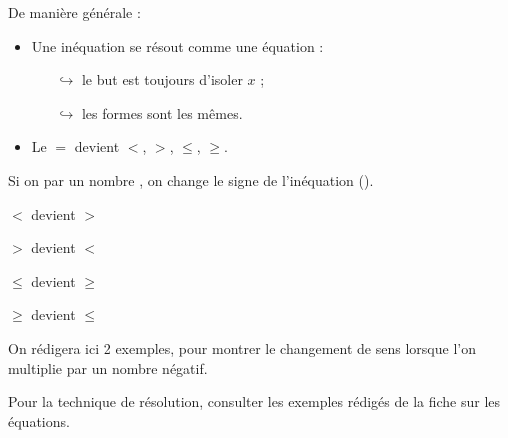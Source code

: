 \ifdefined\COMPLETE
\else
    
    
\fi

                 
                 
\bigskip     

De manière générale :

\begin{itemize}
\item Une inéquation se résout comme une équation : 
     \begin{itemize}
     \item [$\hookrightarrow$] le but est toujours d'isoler $x$ ; 
     \item [$\hookrightarrow$] les formes sont les mêmes.
     \end{itemize}
\item Le $=$ devient $<$, $>$, $\leqslant$, $\geqslant$.     
\end{itemize}    

\bigskip 



\medskip 

Si on  par un nombre , on change le signe de l'inéquation ().
   

\medskip 

\begin{description}
\item $<$ devient $>$
\item $>$ devient $<$
\item $\leqslant$ devient $\geqslant$
\item $\geqslant$ devient $\leqslant$
\end{description}             

\bigskip         
                 
                 \centerline{}   
                 
\bigskip   

On rédigera ici 2 exemples, pour montrer le changement de sens lorsque l'on multiplie par un nombre négatif.

Pour la technique de résolution, consulter les exemples rédigés de la fiche sur les équations.

